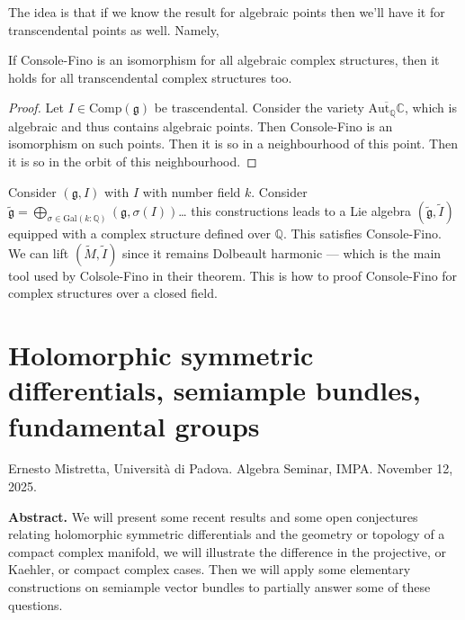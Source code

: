 \noindent
The idea is that if we know the result for
algebraic
points then we'll have it for transcendental
points as well.
Namely,

\begin{lemma}
\label{lemma-if-conso-fino-algeb-then-hold}
If Console-Fino is an isomorphism for all
algebraic complex structures,
then it holds for all transcendental complex
structures too.
\end{lemma}

\begin{proof}
Let $I \in \text{Comp}(\mathfrak{g})$ be
trascendental.
Consider the variety
$\overline{\text{Aut}_{\mathbb{Q}}\mathbb{C}}
$,
which is algebraic and thus contains
algebraic points.
Then Console-Fino is an isomorphism on such
points.
Then it is so in a neighbourhood of this
point.
Then it is so in the orbit of this
neighbourhood.
\end{proof}

\noindent
Consider $(\mathfrak{g},I)$ with $I$ with
number field $k$.
Consider
$\tilde{\mathfrak{g}}=\bigoplus_{\sigma \in
\text{Gal}(k:\mathbb{Q})}
(\mathfrak{g},\sigma(I))$…
this constructions leads to a Lie algebra
$(\tilde{\mathfrak{g}},\tilde{I})$
equipped with a complex structure defined
over $\mathbb{Q}$.
This satisfies Console-Fino. We can lift
$(\tilde{M},\tilde{I})$
since it remains Dolbeault harmonic --- which
is the main tool used by
Colsole-Fino in their theorem.
This is how to proof Console-Fino for complex
structures over a closed field.





\section{Holomorphic symmetric differentials,
semiample bundles,
fundamental groups}
\label{section-holom-symme-diffe-semia}

\noindent
Ernesto Mistretta, Università di Padova.
Algebra Seminar, IMPA.
November 12, 2025.

\medskip\noindent
{\bf Abstract.}
We will present some recent results and some
open conjectures relating
holomorphic symmetric differentials and the
geometry or topology of a compact
complex manifold, we will illustrate the
difference in the projective, or
Kaehler, or compact complex cases. Then we
will apply some elementary
constructions on semiample vector bundles to
partially answer some of these
questions.



